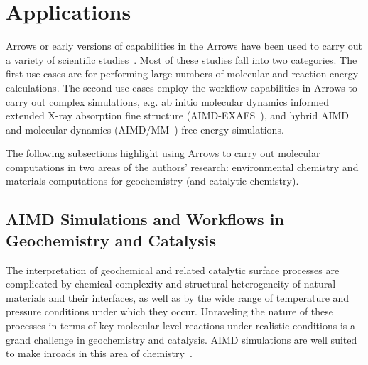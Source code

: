 \documentclass[runningheads,a4paper]{llncs}
\begin{document}
\section{Applications}
\label{sec:Applications}
Arrows or early versions of capabilities in the Arrows have been used to carry out a variety of scientific studies~\cite{salter2015predicting,bylaska2017plane,bylaska2019association,low2019q,north2020nitrogenase,torralba2020reduction,trainer2020organic,mcneill2020reaction,bylaska2020filon,ilton2020using,harouaka2020gas,bylaska2020electron,apra2020nwchem,bylaska2021quantum,mergelsberg2021resolving,gao2021quantitative}. Most of these studies fall into two categories.  The first use cases are for performing large numbers of molecular and reaction energy calculations.  The second use cases employ the workflow capabilities in Arrows to carry out complex simulations, e.g. ab initio molecular dynamics informed extended X-ray absorption fine structure (AIMD-EXAFS~\cite{fulton2012near}), and hybrid AIMD and molecular dynamics (AIMD/MM~\cite{laio2002hamiltonian,cauet2010structure}) free energy simulations.  

The following subsections highlight using Arrows to carry out molecular computations in two areas of the authors' research: environmental chemistry and materials computations for geochemistry (and catalytic chemistry). 


\subsection{AIMD Simulations and Workflows in Geochemistry and Catalysis}
\label{sec:geochemistry}

The interpretation of geochemical and related catalytic surface processes are complicated by chemical complexity and structural heterogeneity of natural materials and their interfaces, as well as by the wide range of temperature and pressure conditions under which they occur. Unraveling the nature of these processes in terms of key molecular-level reactions under realistic conditions is a grand challenge in geochemistry and catalysis. AIMD simulations are well suited to make inroads in this area of chemistry~\cite{swaddle2005kinetic,rustad2007ab,atta2012structure,fulton2012near,solve1,solve2,rustad2010isotopic,rustad2010calculation,bylaska2007structure,nichols2008equatorial,cauet2010structure,bogatko2010first,bogatko2013aqueous,mcbriarty2017trace,mcbriarty2017dynamic,kerisit2016ab,bylaska2019association,bylaska2020filon,ilton2020using}.
\end{document}
